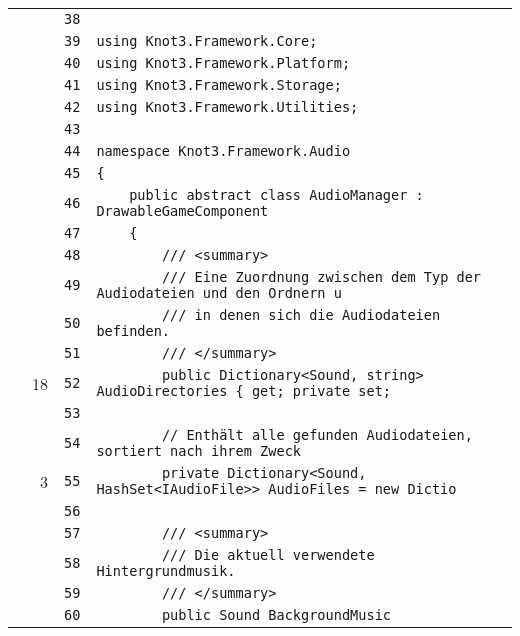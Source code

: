 \documentclass[a4paper,10pt]{article}
\begin{document}
\begin{longtable}[l]{lrrl}
\cellcolor{gray} &  & \verb~38~ & \verb~~\\
\cellcolor{gray} &  & \verb~39~ & \verb~using Knot3.Framework.Core;~\\
\cellcolor{gray} &  & \verb~40~ & \verb~using Knot3.Framework.Platform;~\\
\cellcolor{gray} &  & \verb~41~ & \verb~using Knot3.Framework.Storage;~\\
\cellcolor{gray} &  & \verb~42~ & \verb~using Knot3.Framework.Utilities;~\\
\cellcolor{gray} &  & \verb~43~ & \verb~~\\
\cellcolor{gray} &  & \verb~44~ & \verb~namespace Knot3.Framework.Audio~\\
\cellcolor{gray} &  & \verb~45~ & \verb~{~\\
\cellcolor{gray} &  & \verb~46~ & \verb~    public abstract class AudioManager : DrawableGameComponent~\\
\cellcolor{gray} &  & \verb~47~ & \verb~    {~\\
\cellcolor{gray} &  & \verb~48~ & \verb~        /// <summary>~\\
\cellcolor{gray} &  & \verb~49~ & \verb~        /// Eine Zuordnung zwischen dem Typ der Audiodateien und den Ordnern u~\\
\cellcolor{gray} &  & \verb~50~ & \verb~        /// in denen sich die Audiodateien befinden.~\\
\cellcolor{gray} &  & \verb~51~ & \verb~        /// </summary>~\\
\cellcolor{green} & 18 & \verb~52~ & \verb~        public Dictionary<Sound, string> AudioDirectories { get; private set; ~\\
\cellcolor{gray} &  & \verb~53~ & \verb~~\\
\cellcolor{gray} &  & \verb~54~ & \verb~        // Enthält alle gefunden Audiodateien, sortiert nach ihrem Zweck~\\
\cellcolor{green} & 3 & \verb~55~ & \verb~        private Dictionary<Sound, HashSet<IAudioFile>> AudioFiles = new Dictio~\\
\cellcolor{gray} &  & \verb~56~ & \verb~~\\
\cellcolor{gray} &  & \verb~57~ & \verb~        /// <summary>~\\
\cellcolor{gray} &  & \verb~58~ & \verb~        /// Die aktuell verwendete Hintergrundmusik.~\\
\cellcolor{gray} &  & \verb~59~ & \verb~        /// </summary>~\\
\cellcolor{gray} &  & \verb~60~ & \verb~        public Sound BackgroundMusic~\\

\end{longtable}
\end{document}
